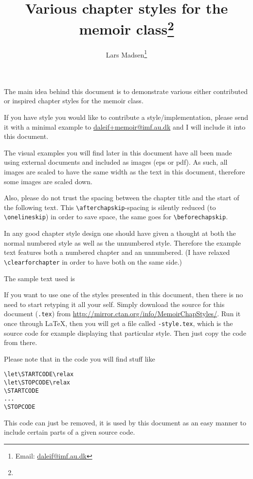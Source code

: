 \title{Various chapter styles for the memoir class\thanks{\MyFileVersion}}
\author{Lars Madsen\thanks{Email: \protect\url{daleif@imf.au.dk}}}
\maketitle

The main idea behind this document is to demonstrate various either
contributed or inspired chapter styles for the memoir class.

If you have style you would like to contribute a style/implementation,
please send it with a minimal example to \url{daleif+memoir@imf.au.dk}
and I will include it into this document.




\noindent The visual examples you will find later in this document
have all been made using external documents and included as images
(eps or pdf). As such, all images are scaled to have the same width as
the  text in this document, therefore some images are scaled down.

Also, please do not trust the spacing between the chapter title and
the start of the following text. This \verb+\afterchapskip+-spacing is
silently reduced (to \verb+\onelineskip+) in order to save space, the
same goes for \verb+\beforechapskip+.


In any good chapter style design one should have given a thought at
both the normal numbered style as well as the unnumbered
style. Therefore the example text features both a numbered chapter and
an unnumbered. (I have relaxed \verb+\clearforchapter+ in order to
have both on the same side.)

The sample text used is


If you want to use one of the styles presented in this document, 
then there is no need to start retyping it all your self. Simply
download the source for this document (\texttt{\jobname.tex}) from
\url{http://mirror.ctan.org/info/MemoirChapStyles/}. Run it
once through \LaTeX, then you will 
get a file called \texttt{-style.tex}, which is the
source code for example displaying that particular style. Then just
copy the code from there.

Please note that in the code you will find stuff like
\begin{Verbatim}
\let\STARTCODE\relax 
\let\STOPCODE\relax 
\STARTCODE
...
\STOPCODE  
\end{Verbatim}
This code can just be removed, it is used by this document as an easy
manner to include certain parts of a given source code.

